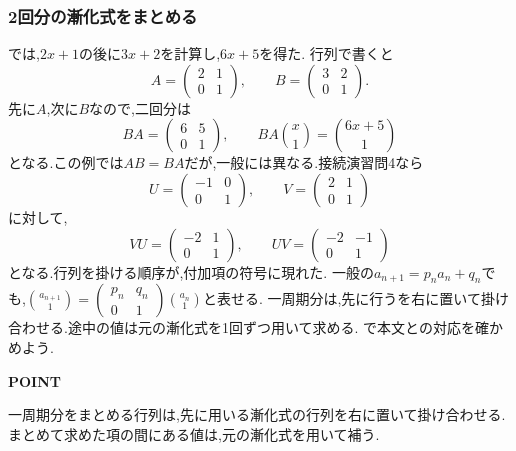 \subsubsection{2回分の漸化式をまとめる}\label{節：2回分の漸化式をまとめる}
では,$2x+1$の後に$3x+2$を計算し,$6x+5$を得た.
行列で書くと
\[
  A=\begin{pmatrix}2&1\\0&1\end{pmatrix},\qquad
  B=\begin{pmatrix}3&2\\0&1\end{pmatrix}.
\]
先に$A$,次に$B$なので,二回分は
\[
  BA=\begin{pmatrix}6&5\\0&1\end{pmatrix},\qquad
  BA\binom{x}{1}=\binom{6x+5}{1}
\]
となる.この例では$AB=BA$だが,一般には異なる.接続演習問4なら
\[
  U=\begin{pmatrix}-1&0\\0&1\end{pmatrix},\qquad
  V=\begin{pmatrix}2&1\\0&1\end{pmatrix}
\]
に対して,
\[
  VU=\begin{pmatrix}-2&1\\0&1\end{pmatrix},\qquad
  UV=\begin{pmatrix}-2&-1\\0&1\end{pmatrix}
\]
となる.行列を掛ける順序が,付加項の符号に現れた.
一般の$a_{n+1}=p_na_n+q_n$でも,$\binom{a_{n+1}}1=
  \begin{pmatrix}p_n&q_n\\0&1\end{pmatrix}\binom{a_n}1$と表せる.
一周期分は,先に行うを右に置いて掛け合わせる.途中の値は元の漸化式を1回ずつ用いて求める.
で本文との対応を確かめよう.

\begin{bookpoint}
  \textbf{POINT}\par
  一周期分をまとめる行列は,先に用いる漸化式の行列を右に置いて掛け合わせる.
  まとめて求めた項の間にある値は,元の漸化式を用いて補う.
\end{bookpoint}
